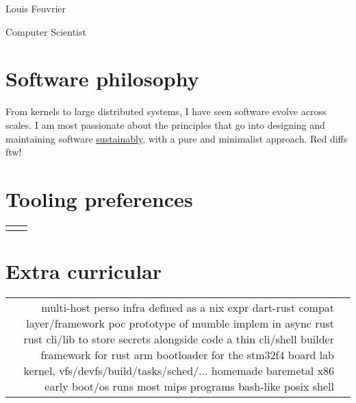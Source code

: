 \documentclass[
	10pt, %
]{freemancv}
\begin{document}
\begin{paracol}{2} %

\parbox[][0.11\textheight][c]{\linewidth}{ %
	\centering %

	{\sffamily\Huge Louis Feuvrier} %

	\medskip %

	{\textcolor{headings}{Computer Scientist}}

	\medskip %


	\vfill %
}

\section{Software philosophy}
From kernels to large distributed systems, I have seen software evolve across
scales. I am most passionate about the principles that go into designing and
maintaining software \href{https://louis.feuvrier.org/naur1985programming.pdf}{sustainably},
with a pure and minimalist approach. Red diffs ftw!

\section{Tooling preferences}
\begin{supertabular}{r l} %
\end{supertabular}

\section{Extra curricular}
\begin{supertabular}{r l} %
		{multi-host perso infra defined as a nix expr}{}
		{dart-rust compat layer/framework poc}{}
		{prototype of mumble implem in async rust}{}
		{rust cli/lib to store secrets alongside code}{}
		{a thin cli/shell builder framework for rust}{}
		{arm bootloader for the stm32f4 board}{}
		{lab kernel, vfs/devfs/build/tasks/sched/...}{}
		{homemade baremetal x86 early boot/os}{}
		{runs most mips programs}{}
		{bash-like posix shell}{}
\end{supertabular}


\end{paracol}
\end{document}
